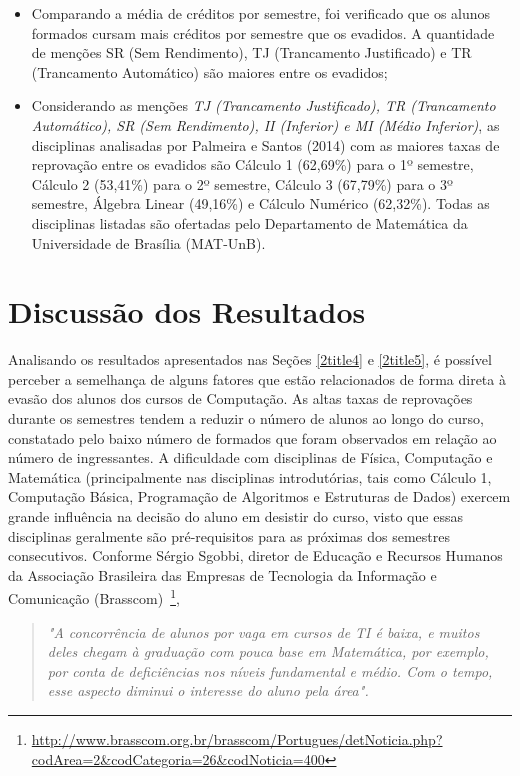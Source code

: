 \begin{itemize}
\item Comparando a média de créditos por semestre, foi verificado que os alunos formados cursam mais créditos por semestre que os evadidos. A quantidade de menções SR (Sem Rendimento), TJ (Trancamento Justificado) e TR (Trancamento Automático) são maiores entre os evadidos;
\item Considerando as menções \textit{TJ (Trancamento Justificado), TR (Trancamento Automático), SR (Sem Rendimento), II (Inferior) e MI (Médio Inferior)}, as disciplinas analisadas por Palmeira e Santos (2014) com as maiores taxas de reprovação entre os evadidos são Cálculo 1 (62,69\%) para o 1º semestre, Cálculo 2 (53,41\%) para o 2º semestre, Cálculo 3  (67,79\%) para o 3º semestre, Álgebra Linear (49,16\%) e Cálculo Numérico (62,32\%). Todas as disciplinas listadas são ofertadas pelo Departamento de Matemática da Universidade de Brasília (MAT-UnB).
\end{itemize}

\section {Discussão dos Resultados} \label{2title6}

Analisando os resultados apresentados nas Seções \ref{2title4} e \ref{2title5}, é possível perceber a semelhança de alguns fatores que estão relacionados de forma direta à evasão dos alunos dos cursos de Computação.  As altas taxas de reprovações durante os semestres tendem a reduzir o número de alunos ao longo do curso, constatado pelo baixo número de formados que foram observados em relação ao número de ingressantes. A dificuldade com disciplinas de Física, Computação e Matemática (principalmente nas disciplinas introdutórias, tais como Cálculo 1,  Computação Básica, Programação de Algoritmos e Estruturas de Dados) exercem grande influência na decisão do aluno em desistir do curso, visto que essas disciplinas geralmente são pré-requisitos para as próximas dos semestres consecutivos. Conforme Sérgio Sgobbi, diretor de Educação e Recursos Humanos da Associação Brasileira das Empresas de Tecnologia da Informação e Comunicação (Brasscom)~\footnote{\url{http://www.brasscom.org.br/brasscom/Portugues/detNoticia.php?codArea=2&codCategoria=26&codNoticia=400}}, 

\begin{quotation}
\textit{"A concorrência de alunos por vaga em cursos de TI é baixa, e muitos deles chegam à graduação com pouca base em Matemática, por exemplo, por conta de deficiências nos níveis fundamental e médio. Com o tempo, esse aspecto diminui o interesse do aluno pela área".}
\end{quotation}

